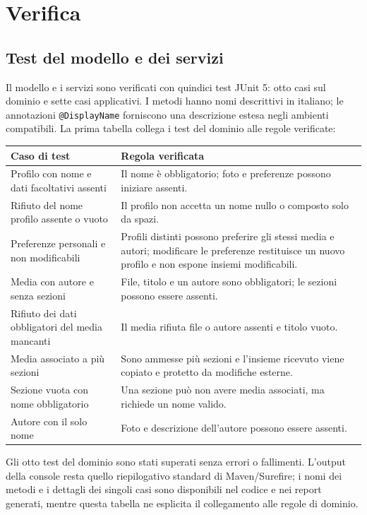 \chapter{Verifica}

\section{Test del modello e dei servizi}
Il modello e i servizi sono verificati con quindici test JUnit 5: otto casi sul dominio e sette casi applicativi. I metodi hanno nomi descrittivi in italiano; le annotazioni \texttt{@DisplayName} forniscono una descrizione estesa negli ambienti compatibili. La prima tabella collega i test del dominio alle regole verificate:

\begin{center}
\small
\renewcommand{\arraystretch}{1.2}
\begin{tabular}{|p{5.2cm}|p{9.4cm}|}
\hline
\textbf{Caso di test} & \textbf{Regola verificata} \\
\hline
Profilo con nome e dati facoltativi assenti & Il nome è obbligatorio; foto e preferenze possono iniziare assenti. \\
\hline
Rifiuto del nome profilo assente o vuoto & Il profilo non accetta un nome nullo o composto solo da spazi. \\
\hline
Preferenze personali e non modificabili & Profili distinti possono preferire gli stessi media e autori; modificare le preferenze restituisce un nuovo profilo e non espone insiemi modificabili. \\
\hline
Media con autore e senza sezioni & File, titolo e un autore sono obbligatori; le sezioni possono essere assenti. \\
\hline
Rifiuto dei dati obbligatori del media mancanti & Il media rifiuta file o autore assenti e titolo vuoto. \\
\hline
Media associato a più sezioni & Sono ammesse più sezioni e l'insieme ricevuto viene copiato e protetto da modifiche esterne. \\
\hline
Sezione vuota con nome obbligatorio & Una sezione può non avere media associati, ma richiede un nome valido. \\
\hline
Autore con il solo nome & Foto e descrizione dell'autore possono essere assenti. \\
\hline
\end{tabular}
\end{center}

Gli otto test del dominio sono stati superati senza errori o fallimenti. L'output della console resta quello riepilogativo standard di Maven/Surefire; i nomi dei metodi e i dettagli dei singoli casi sono disponibili nel codice e nei report generati, mentre questa tabella ne esplicita il collegamento alle regole di dominio.

